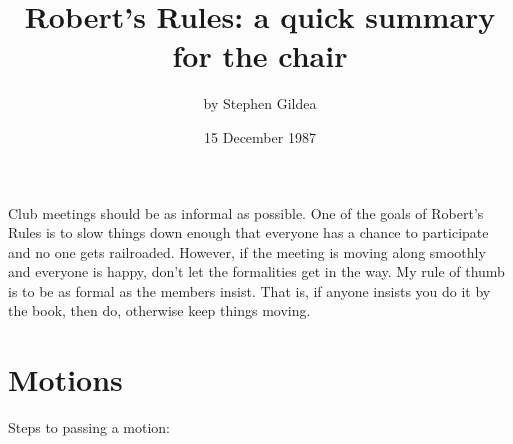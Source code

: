 \pagestyle{empty}
\oddsidemargin 0in
\textwidth 6.5in

\headsep=0pt \headheight=0pt  \topmargin=0in
\textheight=9.4in
\voffset=-0.4in


\title{Robert's Rules: a quick summary for the chair}
\author{by Stephen Gildea}
\date{15 December 1987}
\maketitle
\thispagestyle{empty}

Club meetings should be as informal as possible.  One of the goals of
Robert's Rules is to slow things down enough that everyone has a
chance to participate and no one gets railroaded.  However, if the
meeting is moving along smoothly and everyone is happy, don't let the
formalities get in the way.  My rule of thumb is to be as formal as
the members insist.  That is, if anyone insists you do it by the book,
then do, otherwise keep things moving.

\section{Motions}

Steps to passing a motion:

